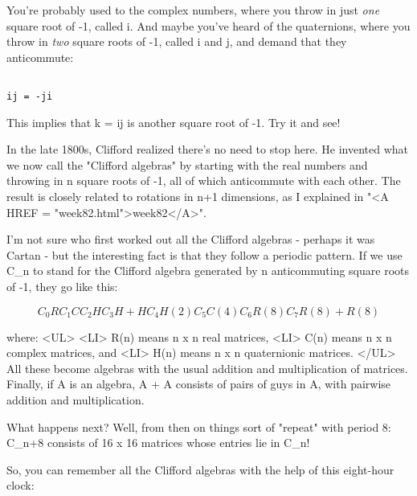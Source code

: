 You're probably used to the complex numbers, where you throw in just 
\emph{one}
square root of -1, called i.  And maybe you've heard of the quaternions, where 
you throw in \emph{two} 
square roots of -1, called i and j, and demand that they
anticommute:


\begin{verbatim}

ij = -ji
\end{verbatim}
    
This implies that k = ij is another square root of -1.   Try it and see!

In the late 1800s, Clifford realized there's no need to stop here.  He invented 
what we now call the "Clifford algebras" by starting with the real numbers and 
throwing in n square roots of -1, all of which anticommute with each other.
The result is closely related to rotations in n+1 dimensions, as I explained in 
"<A HREF = "week82.html">week82</A>".
  
I'm not sure who first worked out all the Clifford algebras - perhaps it was
Cartan - but the interesting fact is that they follow a periodic pattern. 
If we use C_{n} to stand for the Clifford algebra generated by n anticommuting
square roots of -1, they go like this:


$$

C_{0}  R
C_{1}  C
C_{2}  H
C_{3}  H + H
C_{4}  H(2) 
C_{5}  C(4)
C_{6}  R(8)
C_{7}  R(8) + R(8)
$$
    
where:
<UL>
<LI>
 R(n) means n x n real matrices, 
<LI>
 C(n) means n x n complex matrices, and
<LI>
 H(n) means n x n quaternionic matrices.  
</UL>
All these become algebras with the usual addition and multiplication of 
matrices.  Finally, if A is an algebra, A + A consists of pairs of guys 
in A, with pairwise addition and multiplication.

What happens next?  Well, from then on things sort of "repeat" with period 8: 
C_{n+8} 
consists of 16 x 16 matrices whose entries lie in C_{n}!  

So, you can remember all the Clifford algebras with the help of this 
eight-hour clock:





